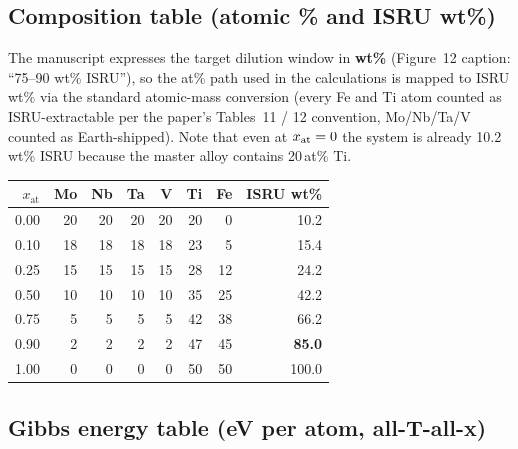 \documentclass[11pt,a4paper]{article}
\begin{document}
\subsection{Composition table (atomic \% and ISRU wt\%)}

The manuscript expresses the target dilution window in \textbf{wt\%} (Figure~12
caption: ``75--90 wt\% ISRU''), so the at\% path used in the calculations is
mapped to ISRU wt\% via the standard atomic-mass conversion (every Fe and Ti
atom counted as ISRU-extractable per the paper's Tables~11 / 12 convention,
Mo/Nb/Ta/V counted as Earth-shipped). Note that even at $x_{\rm at}=0$ the
system is already 10.2\,wt\% ISRU because the master alloy contains 20\,at\%
Ti.

\begin{center}
\begin{tabular}{rrrrrrrr}
\toprule
$x_{\text{at}}$ & Mo & Nb & Ta & V & Ti & Fe & \textbf{ISRU wt\%}\\
\midrule
0.00 & 20 & 20 & 20 & 20 & 20 & 0  & \cellcolor{soft}10.2\\
0.10 & 18 & 18 & 18 & 18 & 23 & 5  & \cellcolor{soft}15.4\\
0.25 & 15 & 15 & 15 & 15 & 28 & 12 & \cellcolor{soft}24.2\\
0.50 & 10 & 10 & 10 & 10 & 35 & 25 & \cellcolor{soft}42.2\\
0.75 & 5  & 5  & 5  & 5  & 42 & 38 & \cellcolor{soft}66.2\\
0.90 & 2  & 2  & 2  & 2  & 47 & 45 & \cellcolor{soft}\textbf{85.0}\\
1.00 & 0  & 0  & 0  & 0  & 50 & 50 & \cellcolor{soft}100.0\\
\bottomrule
\end{tabular}
\end{center}

\subsection{Gibbs energy table (eV per atom, all-T-all-x)}
\end{document}
